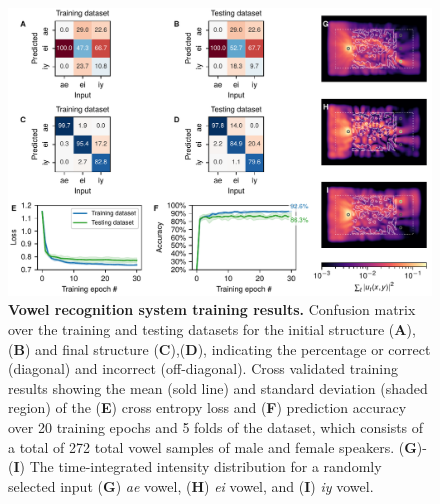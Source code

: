 \begin{figure}
  \centering
  \includegraphics[width=\textwidth]{figures/insitu_RNN_results}
  \caption{\textbf{Vowel recognition system training results.}
  Confusion matrix over the training and testing datasets for the initial structure (\textbf{A}),(\textbf{B}) and final structure (\textbf{C}),(\textbf{D}), indicating the percentage or correct (diagonal) and incorrect (off-diagonal). 
  Cross validated training results showing the mean (sold line) and standard deviation (shaded region) of the (\textbf{E}) cross entropy loss and (\textbf{F}) prediction accuracy over 20 training epochs and 5 folds of the dataset, which consists of a total of 272 total vowel samples of male and female speakers.
  (\textbf{G})-(\textbf{I}) The time-integrated intensity distribution for a randomly selected input (\textbf{G}) \textit{ae} vowel, (\textbf{H}) \textit{ei} vowel, and (\textbf{I}) \textit{iy} vowel.}
  \label{fig:results}
\end{figure}

